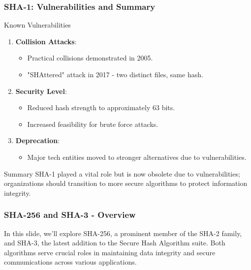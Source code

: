 \documentclass{beamer}
\begin{document}
\begin{frame}[fragile]
    \frametitle{SHA-1: Vulnerabilities and Summary}
    \begin{block}{Known Vulnerabilities}
        \begin{enumerate}
            \item \textbf{Collision Attacks}:
                \begin{itemize}
                    \item Practical collisions demonstrated in 2005.
                    \item "SHAttered" attack in 2017 - two distinct files, same hash.
                \end{itemize}
            \item \textbf{Security Level}:
                \begin{itemize}
                    \item Reduced hash strength to approximately 63 bits.
                    \item Increased feasibility for brute force attacks.
                \end{itemize}
            \item \textbf{Deprecation}:
                \begin{itemize}
                    \item Major tech entities moved to stronger alternatives due to vulnerabilities.
                \end{itemize}
        \end{enumerate}
    \end{block}

    \begin{block}{Summary}
        SHA-1 played a vital role but is now obsolete due to vulnerabilities; organizations should transition to more secure algorithms to protect information integrity.
    \end{block}
\end{frame}

\begin{frame}[fragile]
    \frametitle{SHA-256 and SHA-3 - Overview}
    In this slide, we'll explore SHA-256, a prominent member of the SHA-2 family, and SHA-3, the latest addition to the Secure Hash Algorithm suite. 
    Both algorithms serve crucial roles in maintaining data integrity and secure communications across various applications.
\end{frame}
\end{document}
